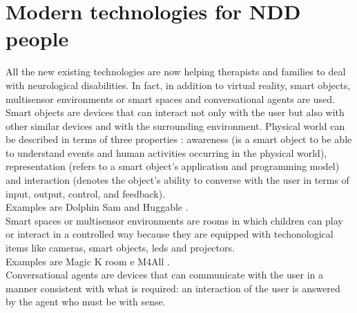 \section{Modern technologies for NDD people}
All the new existing technologies are now helping therapists and families to deal with neurological disabilities. In fact, in addition to virtual reality, smart objects, multisensor environments or smart spaces and conversational agents are used.\\
Smart objects are devices that can interact not only with the user but also with other similar devices and with the surrounding environment. Physical world can be described in terms of three properties \cite{Smart}: awareness (is a smart object to be able to understand events and human activities occurring in the physical world), representation (refers to a smart object's application and programming model) and interaction (denotes the object's ability to converse with the user in terms of input, output, control, and feedback).\\
Examples are Dolphin Sam \cite{Dolphin} and  Huggable \cite{Huggable}. \\
Smart spaces or multisensor environments are rooms in which children can play or interact in a controlled way because they are equipped with techonological items like cameras, smart objects, leds and projectors.
\\
Examples are Magic K room e M4All \cite{M4all}. \\
Conversational agents are devices that can communicate with the user in a manner consistent with what is required: an interaction of the user is answered by the agent who must be with sense.\\
